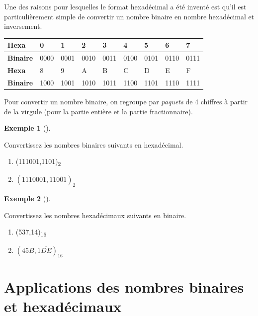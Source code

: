 \documentclass[
  letterpaper,
]{scrbook}
\providecommand{\tightlist}{%
  \setlength{\itemsep}{0pt}\setlength{\parskip}{0pt}}\usepackage{longtable,booktabs,array}
\theoremstyle{plain}
\theoremstyle{definition}
\newtheorem{example}{Exemple}[chapter]
\theoremstyle{definition}
\theoremstyle{remark}
\begin{document}
Une des raisons pour lesquelles le format hexadécimal a été inventé est
qu'il est particulièrement simple de convertir un nombre binaire en
nombre hexadécimal et inversement.

\begin{longtable}[]{@{}lllllllll@{}}
\toprule()
\textbf{Hexa} & 0 & 1 & 2 & 3 & 4 & 5 & 6 & 7 \\
\midrule()
\endhead
\textbf{Binaire} & 0000 & 0001 & 0010 & 0011 & 0100 & 0101 & 0110 &
0111 \\
\textbf{Hexa} & 8 & 9 & A & B & C & D & E & F \\
\textbf{Binaire} & 1000 & 1001 & 1010 & 1011 & 1100 & 1101 & 1110 &
1111 \\
\bottomrule()
\end{longtable}

Pour convertir un nombre binaire, on regroupe par \emph{paquets} de 4
chiffres à partir de la virgule (pour la partie entière et la partie
fractionnaire).

\leavevmode{}%
\begin{example}[]\label{exm-conversion-binaire-hexadecimal}

Convertissez les nombres binaires suivants en hexadécimal.

\begin{enumerate}
\def\labelenumi{\alph{enumi})}
\tightlist
\item
  (111001,1101)\textsubscript{2}
\item
  \((1110001,11\overline{001})_2\)
\end{enumerate}

\end{example}

\leavevmode{}%
\begin{example}[]\label{exm-conversion-hexadecimal-binaire}

Convertissez les nombres hexadécimaux suivants en binaire.

\begin{enumerate}
\def\labelenumi{\alph{enumi})}
\tightlist
\item
  (537,14)\textsubscript{16}
\item
  \((45B,1\overline{DE})_{16}\)
\end{enumerate}

\end{example}

\hypertarget{applications-des-nombres-binaires-et-hexaduxe9cimaux}{%
\section{Applications des nombres binaires et
hexadécimaux}\label{applications-des-nombres-binaires-et-hexaduxe9cimaux}}
\end{document}
